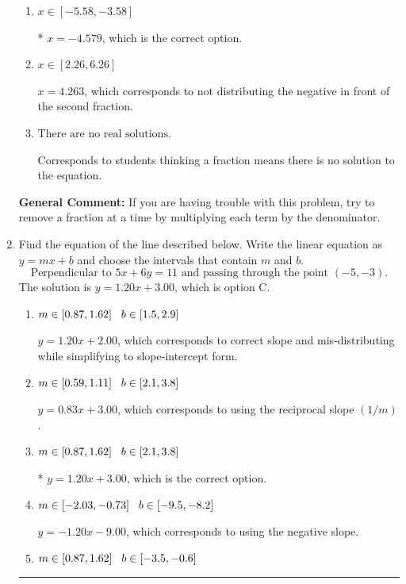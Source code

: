 \documentclass{extbook}[14pt]
\newcommand{\litem}[1]{\item #1

\rule{\textwidth}{0.4pt}}
\begin{document}
\begin{enumerate}
{\begin{enumerate}[label=\Alph*.]
 $x = 1.554$, which corresponds to dividing the second number in the numerator by the denominator rather than dividing BOTH parts of the numerator by the denominator (or removing the fractions through multiplication).
\item \( x \in [-5.58, -3.58] \)

* $x = -4.579$, which is the correct option.
\item \( x \in [2.26, 6.26] \)

 $x = 4.263$, which corresponds to not distributing the negative in front of the second fraction.
\item \( \text{There are no real solutions.} \)

Corresponds to students thinking a fraction means there is no solution to the equation.
\end{enumerate}

\textbf{General Comment:} If you are having trouble with this problem, try to remove a fraction at a time by multiplying each term by the denominator.
}
\litem{
Find the equation of the line described below. Write the linear equation as $ y=mx+b $ and choose the intervals that contain $m$ and $b$.
\[ \text{Perpendicular to } 5 x + 6 y = 11 \text{ and passing through the point } (-5, -3). \]
The solution is \( y = 1.20x + 3.00 \), which is option C.\begin{enumerate}[label=\Alph*.]
\item \( m \in [0.87, 1.62] \hspace*{3mm} b \in [1.5, 2.9] \)

 $y = 1.20x + 2.00$, which corresponds to correct slope and mis-distributing while simplifying to slope-intercept form.
\item \( m \in [0.59, 1.11] \hspace*{3mm} b \in [2.1, 3.8] \)

 $y = 0.83x + 3.00$, which corresponds to using the reciprocal slope $(1/m)$.
\item \( m \in [0.87, 1.62] \hspace*{3mm} b \in [2.1, 3.8] \)

* $y = 1.20x + 3.00$, which is the correct option.
\item \( m \in [-2.03, -0.73] \hspace*{3mm} b \in [-9.5, -8.2] \)

 $y = -1.20x - 9.00$, which corresponds to using the negative slope.
\item \( m \in [0.87, 1.62] \hspace*{3mm} b \in [-3.5, -0.6] \)


\end{enumerate}}
\end{enumerate}
\end{document}
